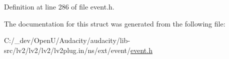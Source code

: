 Definition at line 286 of file event.\+h.



The documentation for this struct was generated from the following file\+:\begin{DoxyCompactItemize}
\item 
C\+:/\+\_\+dev/\+Open\+U/\+Audacity/audacity/lib-\/src/lv2/lv2/lv2/lv2plug.\+in/ns/ext/event/\hyperlink{event_8h}{event.\+h}\end{DoxyCompactItemize}
